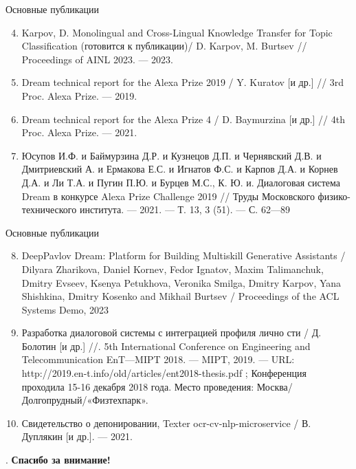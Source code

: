 \begin{frame}{Основные публикации}
\begin{enumerate}
\setcounter{enumi}{3}
\item Karpov, D. Monolingual and Cross-Lingual Knowledge Transfer for
Topic Classification (готовится к публикации)/ D. Karpov,
M. Burtsev // Proceedings of AINL 2023. — 2023.
\item Dream technical report for the Alexa Prize 2019 / Y. Kuratov
[и др.] // 3rd Proc. Alexa Prize. — 2019.
\item Dream technical report for the Alexa Prize 4  / D. Baymurzina
[и др.] // 4th Proc. Alexa Prize. — 2021.
\item Юсупов И.Ф. и Баймурзина Д.Р. и Кузнецов Д.П. и Чернявский Д.В. и Дмитриевский А. и Ермакова Е.С. и Игнатов Ф.С. и Карпов Д.А. и Корнев Д.А. и Ли Т.А. и Пугин П.Ю. и Бурцев М.С., К. Ю. и. Диалоговая система Dream в конкурсе Alexa
Prize Challenge 2019 // Труды Московского физико-технического
института. — 2021. — Т. 13, 3 (51). — С. 62—89
\end{enumerate}
\end{frame}
\begin{frame}{Основные публикации}
\begin{enumerate}
\setcounter{enumi}{7}
\item DeepPavlov Dream: Platform for Building Multiskill Generative Assistants / Dilyara Zharikova, Daniel Kornev, Fedor Ignatov, Maxim Talimanchuk, Dmitry Evseev, Ksenya Petukhova, Veronika Smilga, Dmitry Karpov, Yana Shishkina, Dmitry Kosenko and Mikhail Burtsev / Proceedings of the ACL Systems Demo, 2023
\item Разработка диалоговой системы с интеграцией профиля лично­
сти  / Д. Болотин [и др.] //. 5th International Conference
on Engineering and Telecommunication EnT—MIPT 2018. — MIPT,
2019. — URL: http://2019.en-t.info/old/articles/ent2018-thesis.pdf ;
Конференция проходила 15-16 декабря 2018 года. Место проведения:
Москва/Долгопрудный/«Физтехпарк».
\item Свидетельство о депонировании, Texter ocr-cv-nlp-microservice / В. Дуплякин [и др.]. — 2021.
\end{enumerate}    
\end{frame}

\begin{frame}{.}
\centering
\Large \textbf{Спасибо за внимание!}
\end{frame}

